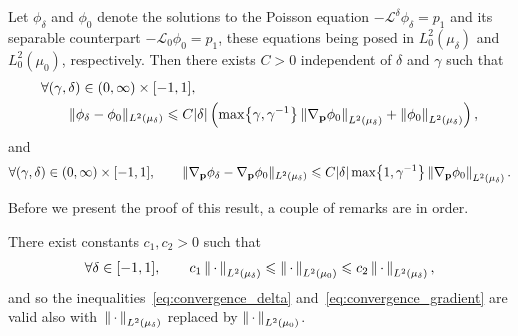 \documentclass[11pt,a4paper]{article}
\begin{document}
\begin{proposition}
    \label{proposition:convergence_gradient}
    Let $\phi_{\delta}$ and $\phi_0$ denote the solutions to the Poisson equation $- \mathcal L^{\delta} \phi_{\delta} = p_1$
    and its separable counterpart $- \mathcal L_0 \phi_0 = p_1$,
    these equations being posed in $L^2_0(\mu_{\delta})$ and $L^2_0(\mu_0)$, respectively.
    Then there exists $C > 0$ independent of $\delta$ and $\gamma$ such that
    \begin{align}
        \notag
        &\forall (\gamma, \delta) \in (0, \infty) \times [-1, 1], \qquad \\
        \label{eq:convergence_delta}
        &\qquad \norm*{\phi_\delta - \phi_0}[L^2(\mu_{\delta})]
        \leq C\lvert \delta \rvert \left(
            \max\bigl\{\gamma,\gamma^{-1}\bigr\} \norm{\grad_{\vect p} \phi_0}[L^2(\mu_{\delta})]
            + \norm{\phi_0}[L^2(\mu_{\delta})]
        \right),
    \end{align}
    and
    \begin{align}
        \label{eq:convergence_gradient}
        \forall (\gamma, \delta) \in (0, \infty) \times [-1, 1], \qquad
        \norm*{\grad_{\vect p} \phi_\delta - \grad_{\vect p} \phi_0}[L^2(\mu_{\delta})]
        \leq C \lvert \delta \rvert  \max\bigl\{1,\gamma^{-1}\bigr\} \norm{\grad_{\vect p} \phi_0}[L^2(\mu_{\delta})] .
    \end{align}
\end{proposition}
Before we present the proof of this result,
a couple of remarks are in order.
\begin{remark}
    \label{remark:norms_equivalent}
    There exist constants $c_1, c_2 > 0$ such that
    \[
        \forall \delta \in [-1, 1], \qquad
        c_1 \norm{\dummy}[L^2(\mu_{\delta})] \leq \norm{\dummy}[L^2(\mu_0)] \leq c_2 \norm{\dummy}[L^2(\mu_{\delta})],
    \]
    and so the inequalities~\eqref{eq:convergence_delta} and~\eqref{eq:convergence_gradient} are valid also with~$\norm{\dummy}[L^2(\mu_{\delta})]$ replaced by $\norm{\dummy}[L^2(\mu_{0})]$.
\end{remark}
\end{document}
